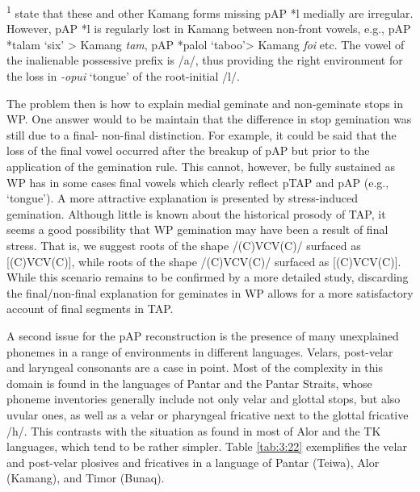 \begin{table}
\textsuperscript{1} \citet{HoltonEtAl2012} state that these and other Kamang forms missing pAP *l medially are irregular. However, pAP *l is regularly lost in Kamang between non-front vowels, e.g., pAP *talam `six' {\textgreater} Kamang \textit{ta{\textlengthmark}m}, pAP *palol `taboo'{\textgreater} Kamang \textit{fo{\textlengthmark}i} etc. The vowel of the inalienable possessive prefix is /a/, thus providing the right environment for the loss in \textit{{}-opui} `tongue' of the root-initial /l/.  
\end{table}


The problem then is how to explain medial geminate and non-geminate stops in WP. One answer would to be maintain that the difference in stop gemination was still due to a final- non-final distinction. For example, it could be said that the loss of the final vowel occurred after the breakup of pAP but prior to the application of the gemination rule. This cannot, however, be fully sustained as WP has in some cases final vowels which clearly reflect pTAP and pAP (e.g., `tongue'). A more attractive explanation is presented by stress-induced gemination. Although little is known about the historical prosody of TAP, it seems a good possibility that WP gemination may have been a result of final stress. That is, we suggest roots of the shape /(C)V{\textprimstress}CV(C)/ surfaced as [(C)V{\textprimstress}C{\textlengthmark}V(C)], while roots of the shape /{\textprimstress}(C)VCV(C)/ surfaced as [{\textprimstress}(C)VCV(C)]. While this scenario remains to be confirmed by a more detailed study, discarding the final/non-final explanation for geminates in WP allows for a more satisfactory account of final segments in TAP.

A second issue for the pAP reconstruction is the presence of many unexplained phonemes in a range of environments in different languages. Velars, post-velar and laryngeal consonants are a case in point. Most of the complexity in this domain is found in the languages of Pantar and the Pantar Straits, whose phoneme inventories generally include not only velar and glottal stops, but also uvular ones, as well as a velar or pharyngeal fricative next to the glottal fricative /h/. This contrasts with the situation as found in most of Alor and the TK languages, which tend to be rather simpler. Table \ref{tab:3:22} exemplifies the velar and post-velar plosives and fricatives in a language of Pantar (Teiwa), Alor (Kamang), and Timor (Bunaq).



